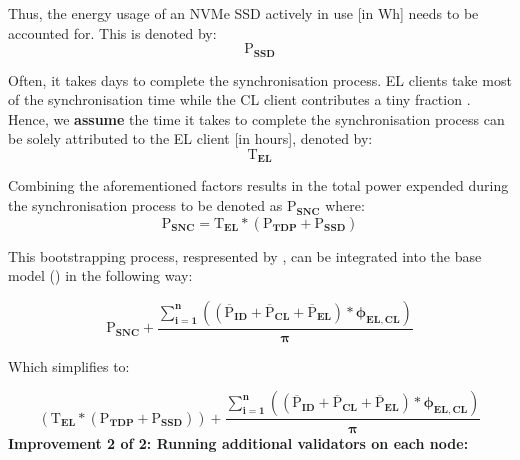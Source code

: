 Thus, the energy usage of an NVMe SSD actively in use [in Wh] needs to be accounted for. This is denoted by:
\begin{equation*}
    \boldsymbol{\mathrm{P}_{SSD} } 
\end{equation*}

Often, it takes days to complete the synchronisation process. EL clients take most of the synchronisation time while the CL client contributes a tiny fraction \cite{Ethereum/go-ethereum:Protocol}. Hence, we \textbf{assume} the time it takes to complete the synchronisation process can be solely attributed to the EL client [in hours], denoted by:
\begin{equation*}
    \boldsymbol{\mathrm{T}_{EL}}
\end{equation*}

Combining the aforementioned factors results in the total power expended during the synchronisation process to be denoted as $\boldsymbol{\mathrm{P}_{SNC}}$ where:
\begin{equation}
    \boldsymbol{\mathrm{P}_{SNC} = \mathrm{T}_{EL} * \left({\mathrm{P}_{TDP}} + \mathrm{P}_{SSD}\right)} \label{eqn:Sync}
\end{equation}

 This bootstrapping process, respresented by , can be integrated into the base model () in the following way:

\begin{equation*}
    \boldsymbol{\mathrm{P}_{SNC} +  {\frac{\displaystyle\sum\limits_{i=1}^{n}{ \left({\left(\mathrm{\overline{P}}_{ID} + \mathrm{\overline{P}}_{CL} + \mathrm{\overline{P}}_{EL}\right)} * {\phi_{EL,CL}} \right)}}
 {\pi}} } 
\end{equation*}

Which simplifies to:

\begin{equation}
     \boldsymbol{\left({\mathrm{T}_{EL} * \left({\mathrm{P}_{TDP}} + \mathrm{P}_{SSD}\right)}\right) +  {\frac{\displaystyle\sum\limits_{i=1}^{n}{ \left({\left(\mathrm{\overline{P}}_{ID} + \mathrm{\overline{P}}_{CL} + \mathrm{\overline{P}}_{EL}\right)} * {\phi_{EL,CL}} \right)}}
{\pi}} } \label{eqn:CCRISync}
\end{equation}
\label{AdditonalNodesReasoning}
\newline \newline
\textbf{ Improvement 2 of 2: Running additional validators on each node:}


